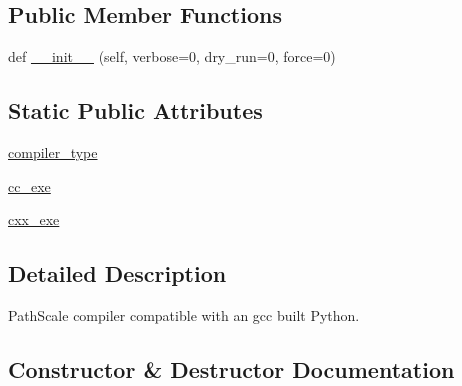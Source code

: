 \subsection*{Public Member Functions}
\begin{DoxyCompactItemize}
\item 
def \hyperlink{classnumpy_1_1distutils_1_1pathccompiler_1_1PathScaleCCompiler_a0061b0e4f3600b8efc866fe8b404890b}{\+\_\+\+\_\+init\+\_\+\+\_\+} (self, verbose=0, dry\+\_\+run=0, force=0)
\end{DoxyCompactItemize}
\subsection*{Static Public Attributes}
\begin{DoxyCompactItemize}
\item 
\hyperlink{classnumpy_1_1distutils_1_1pathccompiler_1_1PathScaleCCompiler_a3b841caa317c4c640c67fbbd1163a40e}{compiler\+\_\+type}
\item 
\hyperlink{classnumpy_1_1distutils_1_1pathccompiler_1_1PathScaleCCompiler_af0c557cb74ea378ee211f0a76aa56829}{cc\+\_\+exe}
\item 
\hyperlink{classnumpy_1_1distutils_1_1pathccompiler_1_1PathScaleCCompiler_ae25eea628b2ddcfbf7196a223d775b92}{cxx\+\_\+exe}
\end{DoxyCompactItemize}


\subsection{Detailed Description}
\begin{DoxyVerb}PathScale compiler compatible with an gcc built Python.
\end{DoxyVerb}
 

\subsection{Constructor \& Destructor Documentation}
\mbox{\label{classnumpy_1_1distutils_1_1pathccompiler_1_1PathScaleCCompiler_a0061b0e4f3600b8efc866fe8b404890b}} 
